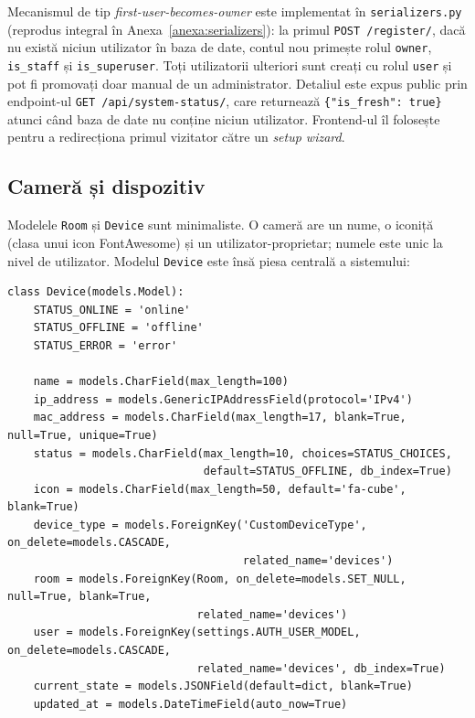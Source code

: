 Mecanismul de tip \textit{first-user-becomes-owner} este implementat în \texttt{serializers.py} (reprodus integral în Anexa~\ref{anexa:serializers}): la primul \texttt{POST /register/}, dacă nu există niciun utilizator în baza de date, contul nou primește rolul \texttt{owner}, \texttt{is\_staff} și \texttt{is\_superuser}. Toți utilizatorii ulteriori sunt creați cu rolul \texttt{user} și pot fi promovați doar manual de un administrator. Detaliul este expus public prin endpoint-ul \texttt{GET /api/system-status/}, care returnează \texttt{\{"is\_fresh": true\}} atunci când baza de date nu conține niciun utilizator. Frontend-ul îl folosește pentru a redirecționa primul vizitator către un \textit{setup wizard}.

\subsection{Cameră și dispozitiv}
Modelele \texttt{Room} și \texttt{Device} sunt minimaliste. O cameră are un nume, o iconiță (clasa unui icon FontAwesome) și un utilizator-proprietar; numele este unic la nivel de utilizator. Modelul \texttt{Device} este însă piesa centrală a sistemului:
\begin{verbatim}
class Device(models.Model):
    STATUS_ONLINE = 'online'
    STATUS_OFFLINE = 'offline'
    STATUS_ERROR = 'error'

    name = models.CharField(max_length=100)
    ip_address = models.GenericIPAddressField(protocol='IPv4')
    mac_address = models.CharField(max_length=17, blank=True, null=True, unique=True)
    status = models.CharField(max_length=10, choices=STATUS_CHOICES,
                              default=STATUS_OFFLINE, db_index=True)
    icon = models.CharField(max_length=50, default='fa-cube', blank=True)
    device_type = models.ForeignKey('CustomDeviceType', on_delete=models.CASCADE,
                                    related_name='devices')
    room = models.ForeignKey(Room, on_delete=models.SET_NULL, null=True, blank=True,
                             related_name='devices')
    user = models.ForeignKey(settings.AUTH_USER_MODEL, on_delete=models.CASCADE,
                             related_name='devices', db_index=True)
    current_state = models.JSONField(default=dict, blank=True)
    updated_at = models.DateTimeField(auto_now=True)
\end{verbatim}

